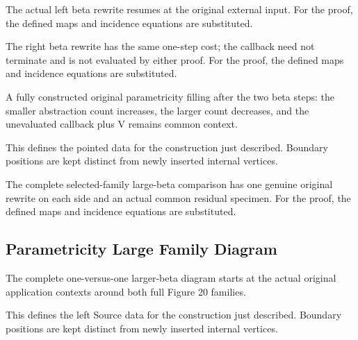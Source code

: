 The actual left beta rewrite resumes at the original external input.
For the proof, the defined maps and incidence equations are substituted.
\par{}

The right beta rewrite has the same one-step cost; the callback need not terminate and is not evaluated by either proof.
For the proof, the defined maps and incidence equations are substituted.
\par{}

A fully constructed original parametricity filling after the two beta steps: the smaller abstraction count increases, the larger count decreases, and the unevaluated callback plus V remains common context.
\par{}

This defines the pointed data for the construction just described. Boundary positions are kept distinct from newly inserted internal vertices.
\par{}

The complete selected-family large-beta comparison has one genuine original rewrite on each side and an actual common residual specimen.
For the proof, the defined maps and incidence equations are substituted.
\par{}

\subsection{Parametricity Large Family Diagram}
The complete one-versus-one larger-beta diagram starts at the actual original application contexts around both full Figure 20 families.

This defines the left Source data for the construction just described. Boundary positions are kept distinct from newly inserted internal vertices.
\par{}

